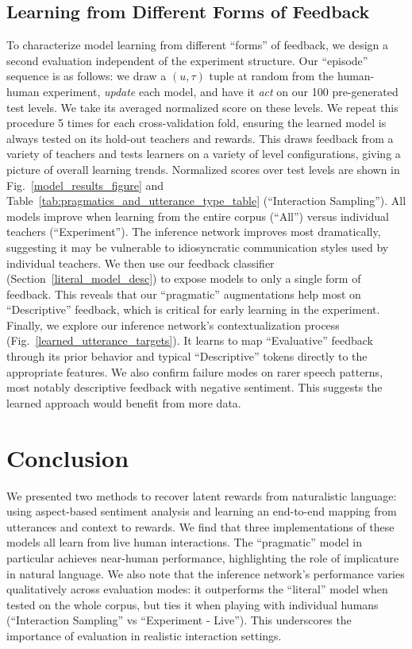 \documentclass[letterpaper]{article} %
\begin{document}
\subsection{Learning from Different Forms of Feedback}
\label{random_sample_interactions}
\label{feedback_types}
To characterize model learning from different ``forms'' of feedback, we design a second evaluation independent of the experiment structure. Our ``episode'' sequence is as follows: we draw a $(u, \tau)$ tuple at random from the human-human experiment, \emph{update} each model, and have it \emph{act} on our 100 pre-generated test levels. We take its averaged normalized score on these levels. We repeat this procedure 5 times for each cross-validation fold, ensuring the learned model is always tested on its hold-out teachers and rewards. This draws feedback from a variety of teachers and tests learners on a variety of level configurations, giving a picture of overall learning trends. Normalized scores over test levels are shown in Fig.~\ref{model_results_figure} and Table~\ref{tab:pragmatics_and_utterance_type_table} (``Interaction Sampling''). All models improve when learning from the entire corpus (``All'') versus individual teachers (``Experiment''). The inference network improves most dramatically, suggesting it may be vulnerable to idiosyncratic communication styles used by individual teachers. We then use our feedback classifier (Section~\ref{literal_model_desc}) to expose models to only a single form of feedback. This reveals that our ``pragmatic'' augmentations help most on ``Descriptive'' feedback, which is critical for early learning in the experiment. Finally, we explore our inference network's contextualization process (Fig.~\ref{learned_utterance_targets}). It learns to map ``Evaluative'' feedback through its prior behavior and typical ``Descriptive'' tokens directly to the appropriate features. We also confirm failure modes on rarer speech patterns, most notably descriptive feedback with negative sentiment. This suggests the learned approach would benefit from more data.

\vspace{-2.30mm}
\section{Conclusion}
\label{conclusion_section}
We presented two methods to recover latent rewards from naturalistic language: using aspect-based sentiment analysis and learning an end-to-end mapping from utterances and context to rewards. We find that three implementations of these models all learn from live human interactions. The ``pragmatic'' model in particular achieves near-human performance, highlighting the role of implicature in natural language. We also note that the inference network's performance varies qualitatively across evaluation modes: it outperforms the ``literal'' model when tested on the whole corpus, but ties it when playing with individual humans (``Interaction Sampling'' vs ``Experiment - Live''). This underscores the importance of evaluation in realistic interaction settings.
\end{document}
